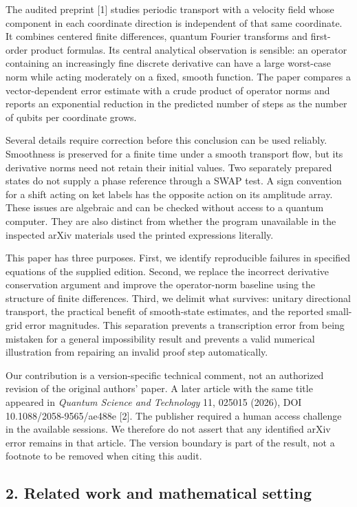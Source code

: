 The audited preprint {[}1{]} studies periodic transport with a velocity
field whose component in each coordinate direction is independent of
that same coordinate. It combines centered finite differences, quantum
Fourier transforms and first-order product formulas. Its central
analytical observation is sensible: an operator containing an
increasingly fine discrete derivative can have a large worst-case norm
while acting moderately on a fixed, smooth function. The paper compares
a vector-dependent error estimate with a crude product of operator norms
and reports an exponential reduction in the predicted number of steps as
the number of qubits per coordinate grows.

Several details require correction before this conclusion can be used
reliably. Smoothness is preserved for a finite time under a smooth
transport flow, but its derivative norms need not retain their initial
values. Two separately prepared states do not supply a phase reference
through a SWAP test. A sign convention for a shift acting on ket labels
has the opposite action on its amplitude array. These issues are
algebraic and can be checked without access to a quantum computer. They
are also distinct from whether the program unavailable in the inspected
arXiv materials used the printed expressions literally.

This paper has three purposes. First, we identify reproducible failures
in specified equations of the supplied edition. Second, we replace the
incorrect derivative conservation argument and improve the operator-norm
baseline using the structure of finite differences. Third, we delimit
what survives: unitary directional transport, the practical benefit of
smooth-state estimates, and the reported small-grid error magnitudes.
This separation prevents a transcription error from being mistaken for a
general impossibility result and prevents a valid numerical illustration
from repairing an invalid proof step automatically.

Our contribution is a version-specific technical comment, not an
authorized revision of the original authors' paper. A later article with
the same title appeared in \emph{Quantum Science and Technology} 11,
025015 (2026), DOI 10.1088/2058-9565/ae488e {[}2{]}. The publisher
required a human access challenge in the available sessions. We
therefore do not assert that any identified arXiv error remains in that
article. The version boundary is part of the result, not a footnote to
be removed when citing this audit.

\subsection{2. Related work and mathematical
setting}\label{related-work-and-mathematical-setting}

